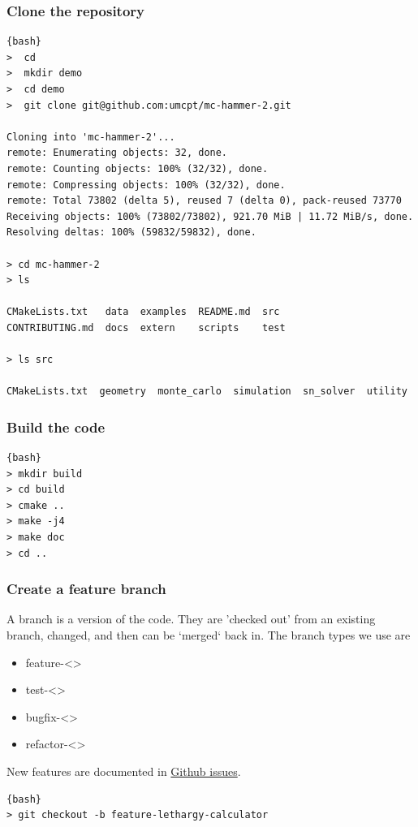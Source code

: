 \documentclass{beamer}
\begin{document}
\begin{frame}[fragile]
\frametitle{Clone the repository}

\scriptsize{
\begin{lstlisting}{bash}
>  cd 
>  mkdir demo
>  cd demo
>  git clone git@github.com:umcpt/mc-hammer-2.git

Cloning into 'mc-hammer-2'...
remote: Enumerating objects: 32, done.
remote: Counting objects: 100% (32/32), done.
remote: Compressing objects: 100% (32/32), done.
remote: Total 73802 (delta 5), reused 7 (delta 0), pack-reused 73770
Receiving objects: 100% (73802/73802), 921.70 MiB | 11.72 MiB/s, done.
Resolving deltas: 100% (59832/59832), done.

> cd mc-hammer-2
> ls

CMakeLists.txt   data  examples  README.md  src
CONTRIBUTING.md  docs  extern    scripts    test

> ls src

CMakeLists.txt  geometry  monte_carlo  simulation  sn_solver  utility
\end{lstlisting}}

\end{frame}

\begin{frame}[fragile]
\frametitle{Build the code}

\scriptsize{
\begin{lstlisting}{bash}
> mkdir build
> cd build
> cmake ..
> make -j4 
> make doc
> cd ..
\end{lstlisting}
}
\end{frame}

\begin{frame}[fragile]
\frametitle{Create a feature branch}
A branch is a version of the code. 
They are 'checked out' from an existing branch, changed, 
and then can be `merged` back in. 
The branch types we use are 
\begin{itemize}
  \item feature-<>
  \item test-<>
  \item bugfix-<>
  \item refactor-<>
\end{itemize}

New features are documented in 
\href{https://github.com/umcpt/mc-hammer-2/issues}{Github issues}.

\scriptsize{
\begin{lstlisting}{bash}
> git checkout -b feature-lethargy-calculator
\end{lstlisting}
}
\end{frame}
\end{document}
